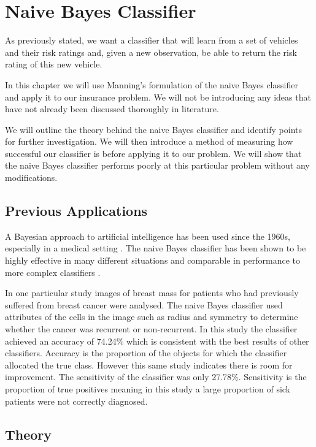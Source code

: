 \chapter{Naive Bayes Classifier}

As previously stated, we want a classifier that will learn from a set of vehicles and their risk ratings and, given a new observation, be able to return the risk rating of this new vehicle.

In this chapter we will use Manning's \cite{Manning08} formulation of the naive Bayes classifier and apply it to our insurance problem.
We will not be introducing any ideas that have not already been discussed thoroughly in literature.

We will outline the theory behind the naive Bayes classifier and identify points for further investigation.
We will then introduce a method of measuring how successful our classifier is before applying it to our problem.
We will show that the naive Bayes classifier performs poorly at this particular problem without any modifications.

\section{Previous Applications}
A Bayesian approach to artificial intelligence has been used since the 1960s, especially in a medical setting \cite{Russell03}.
The naive Bayes classifier has been shown to be highly effective in many different situations and comparable in performance to more complex classifiers \cite{Ashari13}.

In one particular study \cite{Dumitru09} images of breast mass for patients who had previously suffered from breast cancer were analysed.
The naive Bayes classifier used attributes of the cells in the image such as radius and symmetry to determine whether the cancer was recurrent or non-recurrent.
In this study the classifier achieved an accuracy of 74.24\% which is consistent with the best results of other classifiers.
Accuracy is the proportion of the objects for which the classifier allocated the true class.
However this same study indicates there is room for improvement.
The sensitivity of the classifier was only 27.78\%.
Sensitivity is the proportion of true positives meaning in this study a large proportion of sick patients were not correctly diagnosed.

\section{Theory}

